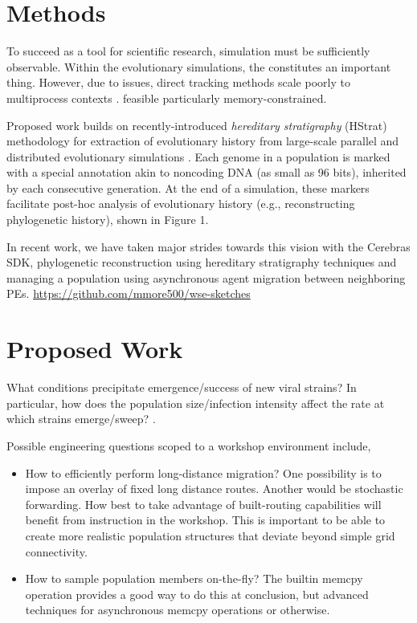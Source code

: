 \section{Methods}



To succeed as a tool for scientific research, simulation must be sufficiently observable.
Within the  evolutionary simulations, the constitutes an important thing.
However, due to issues, direct tracking methods scale poorly to multiprocess contexts \cite{moreno2024analysis}. feasible particularly memory-constrained.

Proposed work builds on recently-introduced \textit{hereditary stratigraphy} (HStrat) methodology for extraction of evolutionary history from large-scale parallel and distributed evolutionary simulations \cite{moreno2022hstrat}.
Each genome in a population is marked with a special annotation akin to noncoding DNA (as small as 96 bits), inherited by each consecutive generation.
At the end of a simulation, these markers facilitate post-hoc analysis of evolutionary history (e.g., reconstructing phylogenetic history), shown in Figure 1.

In recent work, we have taken major strides towards this vision with the Cerebras SDK, phylogenetic reconstruction using hereditary stratigraphy techniques and managing a population using asynchronous agent migration between neighboring PEs.
\url{https://github.com/mmore500/wse-sketches}


\section{Proposed Work}

What conditions precipitate emergence/success of new viral strains?
In particular, how does the population size/infection intensity affect the rate at which strains emerge/sweep? \cite{markov2023evolution}.

Possible engineering questions scoped to a workshop environment include,
\begin{itemize}
\item How to efficiently perform long-distance migration?
One possibility is to impose an overlay of fixed long distance routes.
Another would be stochastic forwarding.
How best to take advantage of built-routing capabilities will benefit from instruction in the workshop.
This is important to be able to create more realistic population structures that deviate beyond simple grid connectivity.
\item How to sample population members on-the-fly?
The builtin memcpy operation provides a good way to do this at conclusion, but advanced techniques for asynchronous memcpy operations or otherwise.
\end{itemize}

